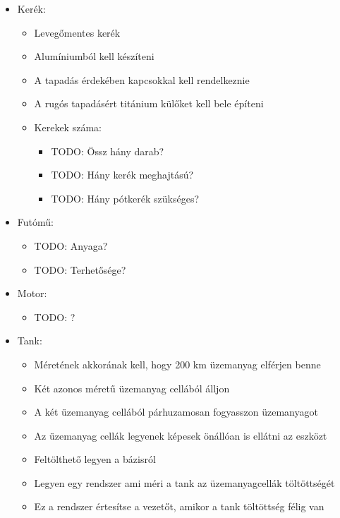 \documentclass[12pt]{report}
\begin{document}
\begin{itemize}
    \item Kerék:
        \begin{itemize}
            \item Levegőmentes kerék
            \item Alumíniumból kell készíteni
            \item A tapadás érdekében kapcsokkal kell rendelkeznie
            \item A rugós tapadásért titánium külőket kell bele építeni
            \item Kerekek száma:
                \begin{itemize}
                    \item TODO: Össz hány darab?
                    \item TODO: Hány kerék meghajtású?
                    \item TODO: Hány pótkerék szükséges?
                \end{itemize}
        \end{itemize}
    \item Futómű:
        \begin{itemize}
            \item TODO: Anyaga?
            \item TODO: Terhetősége?
        \end{itemize}
    \item Motor:
        \begin{itemize}
            \item TODO: ?
        \end{itemize}
    \item Tank:
        \begin{itemize}
            \item Méretének akkorának kell, hogy 200 km üzemanyag elférjen benne
            \item Két azonos méretű üzemanyag cellából álljon
            \item A két üzemanyag cellából párhuzamosan fogyasszon üzemanyagot
            \item Az üzemanyag cellák legyenek képesek önállóan is ellátni az eszközt
            \item Feltölthető legyen a bázisról
            \item Legyen egy rendszer ami méri a tank az üzemanyagcellák töltöttségét
            \item Ez a rendszer értesítse a vezetőt, amikor a tank töltöttség félig van

\end{itemize}
\end{itemize}
\end{document}

